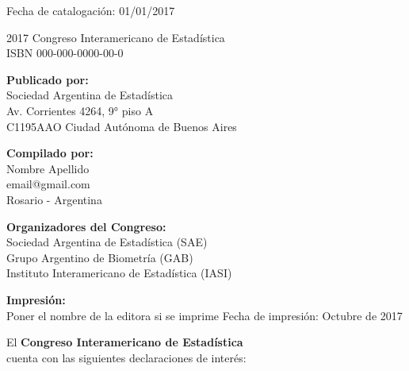 \documentclass[12pt,twoside,a4paper]{article}
\renewcommand{\headrulewidth}{0.4pt}
\renewcommand{\footrulewidth}{0.4pt}
\newcommand{\Footer}{17 al 20 de octubre 2017. Rosario, Argentina}
\newcommand{\SetHeader}[2]{
	\fancyhead{}
	\fancyhead[LE,RO]{\textit{#1}}
	\fancyhead[RE,LO]{ #2}
	\fancyfoot{}
	\fancyfoot[LE,RO]{\thepage}
	\fancyfoot[RE,LO]{\small{\Footer}}
	\renewcommand{\headrulewidth}{0.4pt}
	\renewcommand{\footrulewidth}{0.4pt}
}
\begin{document}
\bigbreak
\footnotesize Fecha de catalogación: 01/01/2017

\vfill

\small{
\noindent\textcopyright{} 2017 Congreso Interamericano de Estadística \\
ISBN 000-000-0000-00-0

\bigbreak
\noindent\textbf {Publicado por:} \\
Sociedad Argentina de Estadística \\
Av. Corrientes 4264, 9° piso A \\
C1195AAO Ciudad Autónoma de Buenos Aires

\bigbreak
\noindent\textbf {Compilado por:}\\
Nombre Apellido \\
email@gmail.com \\
Rosario - Argentina

\bigbreak
\noindent\textbf {Organizadores del Congreso:} \\
Sociedad Argentina de Estadística (SAE) \\
Grupo Argentino de Biometría (GAB) \\
Instituto Interamericano de Estadística (IASI)

\bigbreak
\noindent\textbf {Impresión:} \\
Poner el nombre de la editora si se imprime
\bigbreak
\noindent Fecha de impresión: Octubre de 2017
}



\newpage
\noindent
\thispagestyle{empty}

\vspace*{3cm}

\begin{center}
El {\bfseries Congreso Interamericano de Estadística}\\cuenta con las siguientes declaraciones de interés:\\ 
\end{center}

\end{document}

